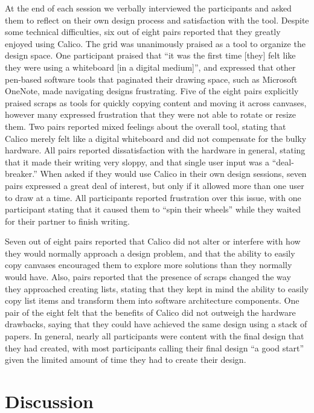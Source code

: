 At the end of each session we verbally interviewed the participants and asked them to reflect on their own design process and satisfaction with the tool. Despite some technical difficulties, six out of eight pairs reported that they greatly enjoyed using Calico. The grid was unanimously praised as a tool to organize the design space. One participant praised that ``it was the first time [they] felt like they were using a whiteboard [in a digital medium]'', and expressed that other pen-based software tools that paginated their drawing space, such as Microsoft OneNote, made navigating designs frustrating. Five of the eight pairs explicitly praised scraps as tools for quickly copying content and moving it across canvases, however many expressed frustration that they were not able to rotate or resize them. Two pairs reported mixed feelings about the overall tool, stating that Calico merely felt like a digital whiteboard and did not compensate for the bulky hardware. All pairs reported dissatisfaction with the hardware in general, stating that it made their writing very sloppy, and that single user input was a ``deal-breaker.'' When asked if they would use Calico in their own design sessions, seven pairs expressed a great deal of interest, but only if it allowed more than one user to draw at a time. All participants reported frustration over this issue, with one participant stating that it caused them to ``spin their wheels'' while they waited for their partner to finish writing. 

Seven out of eight pairs reported that Calico did not alter or interfere with how they would normally approach a design problem, and that the ability to easily copy canvases encouraged them to explore more solutions than they normally would have. Also, pairs reported that the presence of scraps changed the way they approached creating lists, stating that they kept in mind the ability to easily copy list items and transform them into software architecture components. One pair of the eight felt that the benefits of Calico did not outweigh the hardware drawbacks, saying that they could have achieved the same design using a stack of papers. In general, nearly all participants were content with the final design that they had created, with most participants calling their final design ``a good start'' given the limited amount of time they had to create their design. 

\section{Discussion}
\label{discussion}

